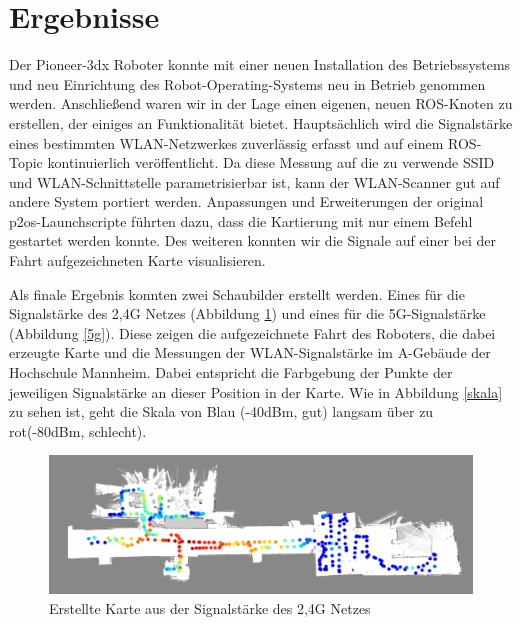 \documentclass{scrartcl}%
\begin{document}
\section{Ergebnisse}
Der Pioneer-3dx Roboter konnte mit einer neuen Installation des Betriebssystems und neu Einrichtung des Robot-Operating-Systems neu in Betrieb genommen werden. Anschließend waren wir in der Lage  einen eigenen, neuen ROS-Knoten zu erstellen, der einiges an Funktionalität bietet. Hauptsächlich wird die Signalstärke eines bestimmten WLAN-Netzwerkes zuverlässig erfasst und auf einem ROS-Topic kontinuierlich veröffentlicht. Da diese Messung auf die zu verwende SSID und WLAN-Schnittstelle parametrisierbar ist, kann der WLAN-Scanner gut auf andere System portiert werden. Anpassungen und Erweiterungen der original p2os-Launchscripte führten dazu, dass die Kartierung mit nur einem Befehl gestartet werden konnte. Des weiteren konnten wir die Signale auf einer bei der Fahrt aufgezeichneten Karte visualisieren. 


Als finale Ergebnis konnten zwei Schaubilder erstellt werden. Eines für die Signalstärke des 2,4G Netzes (Abbildung \ref{2g4}) und eines für die 5G-Signalstärke (Abbildung \ref{5g}). Diese zeigen die aufgezeichnete Fahrt des Roboters, die dabei erzeugte Karte und die Messungen der WLAN-Signalstärke im A-Gebäude der Hochschule Mannheim. Dabei entspricht die Farbgebung der Punkte der jeweiligen Signalstärke an dieser Position in der Karte. Wie in Abbildung \ref{skala} zu sehen ist, geht die Skala von Blau (-40dBm, gut) langsam über zu rot(-80dBm, schlecht).


\begin{figure}[h!]
	\centering
	\includegraphics[width=\textwidth]{bilder/wlan-heatmap-2G4.png}
	\caption{Erstellte Karte aus der Signalstärke des 2,4G Netzes}
	\label{2g4}
\end{figure}
\end{document}
